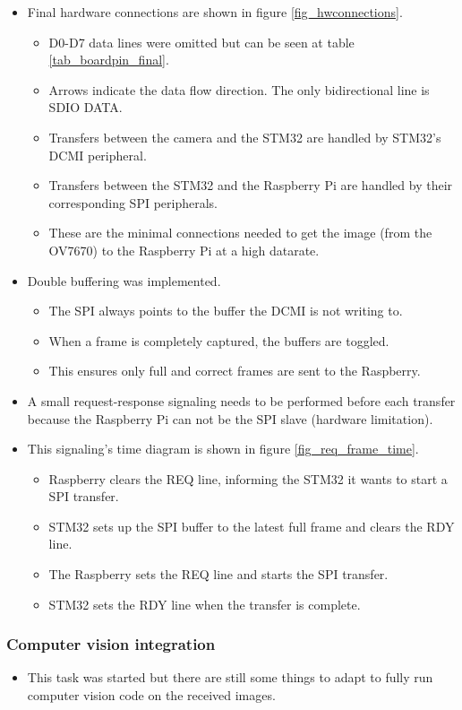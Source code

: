 
\begin{itemize}
	\item Final hardware connections are shown in figure \ref{fig_hwconnections}.
	\begin{itemize}
		\item D0-D7 data lines were omitted but can be seen at table \ref{tab_boardpin_final}.
		\item Arrows indicate the data flow direction. The only bidirectional line is SDIO DATA.
		\item Transfers between the camera and the STM32 are handled by STM32's DCMI peripheral.
		\item Transfers between the STM32 and the Raspberry Pi are handled by their corresponding SPI peripherals.
		\item These are the minimal connections needed to get the image (from the OV7670) to the Raspberry Pi at a high datarate.
	\end{itemize}
\end{itemize}


\begin{itemize}
	\item Double buffering was implemented.
	\begin{itemize}
		\item The SPI always points to the buffer the DCMI is not writing to.
		\item When a frame is completely captured, the buffers are toggled.
		\item This ensures only full and correct frames are sent to the Raspberry.
	\end{itemize}
\end{itemize}


\begin{itemize}
	\item A small request-response signaling needs to be performed before each transfer because the Raspberry Pi can not be the SPI slave (hardware limitation).
	\item This signaling's time diagram is shown in figure \ref{fig_req_frame_time}.
	\begin{itemize}
		\item Raspberry clears the REQ line, informing the STM32 it wants to start a SPI transfer.
		\item STM32 sets up the SPI buffer to the latest full frame and clears the RDY line.
		\item The Raspberry sets the REQ line and starts the SPI transfer.
		\item STM32 sets the RDY line when the transfer is complete.
	\end{itemize}
\end{itemize}

\subsubsection{Computer vision integration}
\begin{itemize}
	\item This task was started but there are still some things to adapt to fully run computer vision code on the received images.
\end{itemize}



